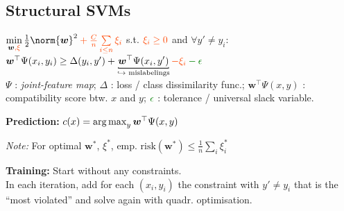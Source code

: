 \subsection{Structural SVMs}

$\min\limits_{\bm w \color{OrangeRed}, \xi} \frac12 \norm{\bm w}^2 \color{OrangeRed} + \frac{C}{n} \sum\limits_{i\leq n} \xi_i$
\quad s.t. $\color{OrangeRed} \xi_i \geq 0$ and $\forall y' \neq y_i :$\\
\quad $\bm w^\top \Psi(x_i, y_i) \geq \Delta(y_i, y') + \underbracket[.7pt][.7pt]{\bm w^\top \Psi(x_i, y')}_{\hookrightarrow \text{ mislabelings}} \color{OrangeRed} - \xi_i \color{Green} - \epsilon$\\


$\Psi$ : \textit{joint-feature map}; \:
$\Delta$ : loss / class dissimilarity func.; \:
$\bm w^\top \Psi(x,y)$ : compatibility score btw. $x$ and $y$; \:
$\color{Green} \epsilon$ : tolerance / universal slack variable.

\textbf{Prediction:} \: $c(x) = \operatorname{arg\,max}_y \bm w^\top \Psi(x,y)$
\vspace{-3pt}

\textit{Note:} For optimal $\bm w^\ast$, $\xi^\ast$, $\textrm{emp. risk}(\bm w^\ast) \leq \frac1n \sum_i \xi_i^\ast$

\textbf{Training:} Start without any constraints.\\
In each iteration, add for each $(x_i,y_i)$ the constraint with $y' {\neq} y_i$ that is the ``most violated'' and solve again with quadr. optimisation.

